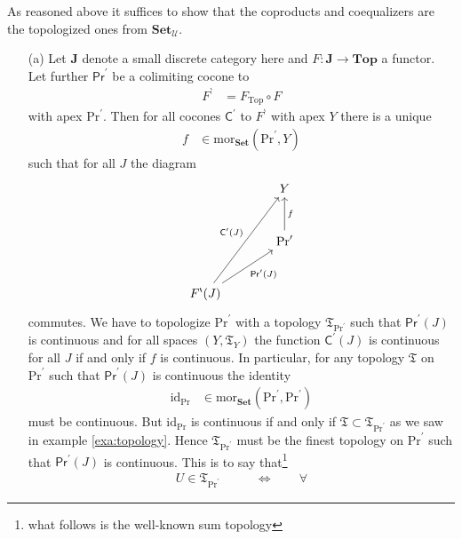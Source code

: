 \begin{prf}
As reasoned above it suffices to show that the coproducts and coequalizers are the topologized ones from $\mathbf{Set}_{\mathcal{U}}$.
\begin{enumerate}
\item[(a)]
Let $\mathbf{J}$ denote a small discrete category here and $F \colon \mathbf{J} \rightarrow \mathbf{Top}$ a functor. Let further $\mathsf{Pr}^{\prime}$ be a colimiting cocone to
\begin{align*}
  F^{\backprime}
  &=
  F_{\mathrm{Top}}
  \circ
  F
\end{align*}
with apex $\mathrm{Pr}^{\prime}$. Then for all cocones $\mathsf{C}^{\prime}$ to $F^{\backprime}$ with apex $Y$ there is a unique
\begin{align*}
  f
  &\in
  \mathrm{mor}_{\mathbf{Set}}
  \left(
    \mathrm{Pr}^{\prime},
    Y
  \right)
\end{align*}
such that for all $J$ the diagram
\[
\begin{tikzcd}[sep=large]
  &
  Y
  \\
  &
  \mathrm{Pr}^{\prime}
  \arrow[swap]{u}{f}
  \\
  F^{\backprime}(J)
  \arrow{uur}{\mathsf{C}^{\prime}(J)}
  \arrow[swap]{ur}{\mathsf{Pr}^{\prime}(J)}
\end{tikzcd}
\]
commutes. We have to topologize $\mathrm{Pr}^{\prime}$ with a topology $\mathfrak{T}_{\mathrm{Pr}^{\prime}}$ such that $\mathsf{Pr}^{\prime}(J)$ is continuous and for all spaces $(Y,\mathfrak{T}_{Y})$ the function $\mathsf{C}^{\prime}(J)$ is continuous for all $J$ if and only if $f$ is continuous. In particular, for any topology $\mathfrak{T}$ on $\mathrm{Pr}^{\prime}$ such that $\mathsf{Pr}^{\prime}(J)$ is continuous the identity
\begin{align*}
  \mathrm{id}_{\mathrm{Pr}}
  &\in
  \mathrm{mor}_{\mathbf{Set}}
  \left(
    \mathrm{Pr}^{\prime},
    \mathrm{Pr}^{\prime}
  \right)
\end{align*}
must be continuous. But $\mathrm{id}_{\mathrm{Pr}}$ is continuous if and only if $\mathfrak{T} \subset \mathfrak{T}_{\mathrm{Pr}^{\prime}}$ as we saw in example \ref{exa:topology}. Hence $\mathfrak{T}_{\mathrm{Pr}^{\prime}}$ must be the finest topology on $\mathrm{Pr}^{\prime}$ such that $\mathsf{Pr}^{\prime}(J)$ is continuous. This is to say that\footnote{what follows is the well-known sum topology}
\begin{align*}
  U
  \in
  \mathfrak{T}_{\mathrm{Pr}^{\prime}}
  \qquad
  &\Leftrightarrow
  \qquad
  \forall

\end{align*}
\end{enumerate}
\end{prf}
